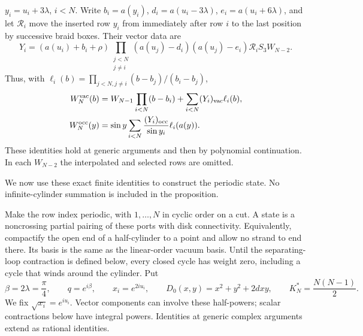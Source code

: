 \begin{proposition}
\begin{enumerate}
$y_i=u_i+3\lambda$, $i<N$. Write $b_i=a(y_i)$,
$d_i=a(u_i-3\lambda)$, $e_i=a(u_i+6\lambda)$, and let $\mathcal R_i$
move the inserted row $y_i$ from immediately after row $i$ to the last
position by successive braid boxes. Their vector data are
\[
 Y_i=(a(u_i)+b_i+\rho)
    \prod_{\substack{j<N\\j\ne i}}(a(u_j)-d_i)(a(u_j)-e_i)
       \mathcal R_iS_3W_{N-2}.
\]
Thus, with $\ell_i(b)=\prod_{j<N,j\ne i}(b-b_j)/(b_i-b_j)$,
\[
\begin{aligned}
 W_N^{\rm vac}(b)&=W_{N-1}\prod_{i<N}(b-b_i)
                          +\sum_{i<N}(Y_i)_{\rm vac}\ell_i(b),\\
 W_N^{\rm occ}(y)&=\sin y\sum_{i<N}
                       \frac{(Y_i)_{\rm occ}}{\sin y_i}\ell_i(a(y)).
\end{aligned}
\]
These identities hold at generic arguments and then by polynomial
continuation. In each $W_{N-2}$ the interpolated and selected rows are
omitted.
\end{enumerate}
\end{proposition}

We now use these exact finite identities to construct the periodic
state. No infinite-cylinder summation is included in the proposition.


Make the row index periodic, with $1,\ldots,N$ in cyclic order on a
cut. A state is a noncrossing partial pairing of these ports with disk
connectivity. Equivalently, compactify the open end of a half-cylinder
to a point and allow no strand to end there. Its basis is the same as
the linear-order vacuum basis. Until the separating-loop contraction
is defined below, every closed cycle has weight zero, including a
cycle that winds around the cylinder. Put
\[
 \beta=2\lambda=\frac\pi4,\qquad q=e^{i\beta},\qquad
 x_i=e^{2iu_i},\qquad D_0(x,y)=x^2+y^2+2dxy,\qquad
 K_N^*=\frac{N(N-1)}2.
\]
We fix $\sqrt{x_i}=e^{iu_i}$. Vector components can involve these
half-powers; scalar contractions below have integral powers. Identities
at generic complex arguments extend as rational identities.

